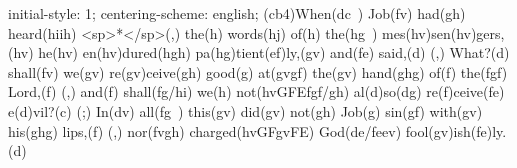 initial-style: 1;
centering-scheme: english;
(cb4)When(dc~) Job(fv) had(gh) heard(hiih) <sp>*</sp>(,) the(h) words(hj) of(h) the(hg~) mes(hv)sen(hv)gers,(hv) he(hv) en(hv)dured(hgh) pa(hg)tient(ef)ly,(gv) and(fe) said,(d) (,) What?(d) shall(fv) we(gv) re(gv)ceive(gh) good(g) at(gvgf) the(gv) hand(ghg) of(f) the(fgf) Lord,(f) (,) and(f) shall(fg/hi) we(h) not(hvGFEfgf/gh) al(d)so(dg) re(f)ceive(fe) e(d)vil?(c) (;) In(dv) all(fg~) this(gv) did(gv) not(gh) Job(g) sin(gf) with(gv) his(ghg) lips,(f) (,) nor(fvgh) charged(hvGFgvFE) God(de/feev) fool(gv)ish(fe)ly.(d)

